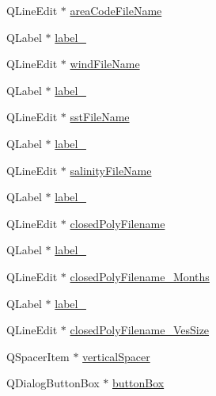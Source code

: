 \begin{DoxyCompactItemize}
\item 
Q\+Line\+Edit $\ast$ \mbox{\hyperlink{class_ui___save_graph_dialog_ae89264c851cb1c5b3edb86a221f39a3b}{area\+Code\+File\+Name}}
\item 
Q\+Label $\ast$ \mbox{\hyperlink{class_ui___save_graph_dialog_a777f35997153480f66db6083326214d2}{label\+\_}}
\item 
Q\+Line\+Edit $\ast$ \mbox{\hyperlink{class_ui___save_graph_dialog_ad4bd943f9ff6e03549667aeb7c4c8908}{wind\+File\+Name}}
\item 
Q\+Label $\ast$ \mbox{\hyperlink{class_ui___save_graph_dialog_af44be7f481d5f0129a442e75a1650d8c}{label\+\_}}
\item 
Q\+Line\+Edit $\ast$ \mbox{\hyperlink{class_ui___save_graph_dialog_a93d25671ee20ac42a82963c1dbd48e35}{sst\+File\+Name}}
\item 
Q\+Label $\ast$ \mbox{\hyperlink{class_ui___save_graph_dialog_a7125ff685606ce753dbde7cfc786836c}{label\+\_}}
\item 
Q\+Line\+Edit $\ast$ \mbox{\hyperlink{class_ui___save_graph_dialog_a73aac43005621571e7cd849b1a9756d0}{salinity\+File\+Name}}
\item 
Q\+Label $\ast$ \mbox{\hyperlink{class_ui___save_graph_dialog_af4c254255a0caa114c445db61e3453e3}{label\+\_}}
\item 
Q\+Line\+Edit $\ast$ \mbox{\hyperlink{class_ui___save_graph_dialog_a07d7d202679b086335be5d0f1896a152}{closed\+Poly\+Filename}}
\item 
Q\+Label $\ast$ \mbox{\hyperlink{class_ui___save_graph_dialog_ae0a5d5fb5e64ccf9d0a4e8ffbb9f8e4a}{label\+\_}}
\item 
Q\+Line\+Edit $\ast$ \mbox{\hyperlink{class_ui___save_graph_dialog_a1430932e3feb9d31f24a1e6e365e8a56}{closed\+Poly\+Filename\+\_\+\+Months}}
\item 
Q\+Label $\ast$ \mbox{\hyperlink{class_ui___save_graph_dialog_ab68542311a6e50e324328a0a42f4d621}{label\+\_}}
\item 
Q\+Line\+Edit $\ast$ \mbox{\hyperlink{class_ui___save_graph_dialog_a21ce3dad6551da449b9ac8a88f4a5163}{closed\+Poly\+Filename\+\_\+\+Ves\+Size}}
\item 
Q\+Spacer\+Item $\ast$ \mbox{\hyperlink{class_ui___save_graph_dialog_a223292d2824d026ed6e48b7fb4f2886d}{vertical\+Spacer}}
\item 
Q\+Dialog\+Button\+Box $\ast$ \mbox{\hyperlink{class_ui___save_graph_dialog_aaa92f9efc0c573b31f0bec4270d887b4}{button\+Box}}
\end{DoxyCompactItemize}


